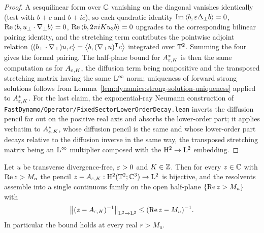 \begin{proof}
  \leanok
  A sesquilinear form over $\mathbb{C} $ vanishing on the diagonal vanishes identically (test with
  $b+c $ and $b+ic $), so each quadratic identity
  $\operatorname{Im}\left\langle b,\varepsilon\Delta_\perp b\right\rangle=0 $, $\operatorname{Re}\left\langle b,u_\perp\cdot\nabla_\perp b\right\rangle=0 $,
  $\operatorname{Re}\left\langle b,2\pi iKu_3b\right\rangle=0 $ upgrades to the corresponding bilinear pairing identity, and
  the stretching term contributes the pointwise adjoint relation
  $\left\langle(b_\perp\cdot\nabla_\perp)u,c\right\rangle=\left\langle b,(\nabla_\perp u)^{\mathsf T}c\right\rangle $
  integrated over $\mathbb{T}^2 $.  Summing the four gives the formal pairing.  The half-plane bound
  for $A^*_{\varepsilon,K} $ is then the same computation as for $A_{\varepsilon,K} $, the diffusion term
  being nonpositive and the transposed stretching matrix having the same $\mathrm{L}^\infty $ norm;
  uniqueness of forward strong solutions follows from
  Lemma~\ref{lem:dynamics:strong-solution-uniqueness} applied to $A^*_{\varepsilon,K} $.  For the
  last claim, the exponential-ray Neumann construction of
  \texttt{FastDynamo/Operator/FixedSectorLowerOrderDecay.lean} inverts the diffusion pencil
  far out on the positive real axis and absorbs the lower-order part; it applies verbatim to
  $A^*_{\varepsilon,K} $, whose diffusion pencil is the same and whose lower-order part decays
  relative to the diffusion inverse in the same way, the transposed stretching matrix being
  an $\mathrm{L}^\infty $ multiplier composed with the $\mathrm{H}^2\to\mathrm{L}^2 $ embedding.
\end{proof}

\begin{proposition}
  \label{prop:dynamics:reduced-half-plane-resolvent}
  \leanok
  Let $u $ be transverse divergence-free, $\varepsilon>0 $ and $K\in\mathbb{Z} $.  Then for every
  $z\in\mathbb{C} $ with $\operatorname{Re} z>M_u $ the pencil $z-A_{\varepsilon,K}:\mathrm{H}^2(\mathbb{T}^2;\mathbb{C}^3)\to\mathrm{L}^2 $ is
  bijective, and the resolvents assemble into a single continuous family on the open
  half-plane $\{\operatorname{Re} z>M_u\} $ with
  \[
    \left\|(z-A_{\varepsilon,K})^{-1}\right\|_{\mathrm{L}^2\to\mathrm{L}^2}\leq(\operatorname{Re} z-M_u)^{-1} .
  \]
  In particular the bound holds at every real $r>M_u $.
\end{proposition}

